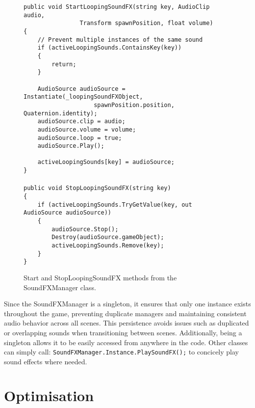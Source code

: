 \documentclass[10pt]{final_report}
\begin{document}
\begin{figure}[H]
\begin{verbatim}
public void StartLoopingSoundFX(string key, AudioClip audio, 
				Transform spawnPosition, float volume)
{
    // Prevent multiple instances of the same sound
    if (activeLoopingSounds.ContainsKey(key))
    {
        return; 
    }

    AudioSource audioSource = Instantiate(_loopingSoundFXObject, 
					spawnPosition.position, Quaternion.identity);
    audioSource.clip = audio;
    audioSource.volume = volume;
    audioSource.loop = true;
    audioSource.Play();

    activeLoopingSounds[key] = audioSource;
}
\end{verbatim} 
\paragraph{}
\begin{verbatim}
public void StopLoopingSoundFX(string key)
{
    if (activeLoopingSounds.TryGetValue(key, out AudioSource audioSource))
    {
        audioSource.Stop();
        Destroy(audioSource.gameObject);
        activeLoopingSounds.Remove(key);
    }
}
\end{verbatim}
\caption{Start and StopLoopingSoundFX methods from the SoundFXManager class.}
\label{loopingsoundfx}
\end{figure}

Since the SoundFXManager is a singleton, it ensures that only one instance exists throughout the game, preventing duplicate managers and maintaining consistent audio behavior across all scenes. This persistence avoids issues such as duplicated or overlapping sounds when transitioning between scenes. Additionally, being a singleton allows it to be easily accessed from anywhere in the code. Other classes can simply call:
\newline
\texttt{SoundFXManager.Instance.PlaySoundFX();} to concicely play sound effects where needed.

\section{Optimisation}\label{optimisationdev}
\end{document}
